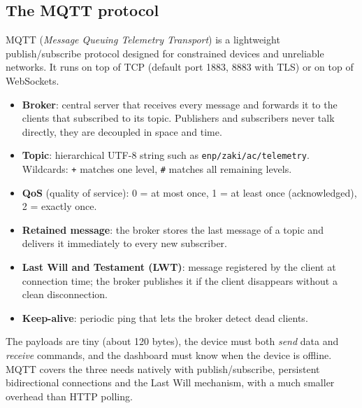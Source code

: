 \documentclass[11pt,a4paper]{article}
\newcommand{\topic}[1]{\texttt{\small #1}}
\begin{document}
\subsection{The MQTT protocol}
MQTT (\emph{Message Queuing Telemetry Transport}) is a lightweight publish/subscribe protocol
designed for constrained devices and unreliable networks. It runs on top of TCP (default port
1883, 8883 with TLS) or on top of WebSockets.

\begin{itemize}
  \item \textbf{Broker}: central server that receives every message and forwards it to the
        clients that subscribed to its topic. Publishers and subscribers never talk directly,
        they are decoupled in space and time.
  \item \textbf{Topic}: hierarchical UTF-8 string such as \topic{enp/zaki/ac/telemetry}.
        Wildcards: \topic{+} matches one level, \topic{\#} matches all remaining levels.
  \item \textbf{QoS} (quality of service): 0 = at most once, 1 = at least once (acknowledged),
        2 = exactly once.
  \item \textbf{Retained message}: the broker stores the last message of a topic and delivers
        it immediately to every new subscriber.
  \item \textbf{Last Will and Testament (LWT)}: message registered by the client at connection
        time; the broker publishes it if the client disappears without a clean disconnection.
  \item \textbf{Keep-alive}: periodic ping that lets the broker detect dead clients.
\end{itemize}

\begin{keybox}
The payloads are tiny (about 120 bytes), the device must both \emph{send} data and
\emph{receive} commands, and the dashboard must know when the device is offline. MQTT covers
the three needs natively with publish/subscribe, persistent bidirectional connections and the
Last Will mechanism, with a much smaller overhead than HTTP polling.
\end{keybox}
\end{document}
